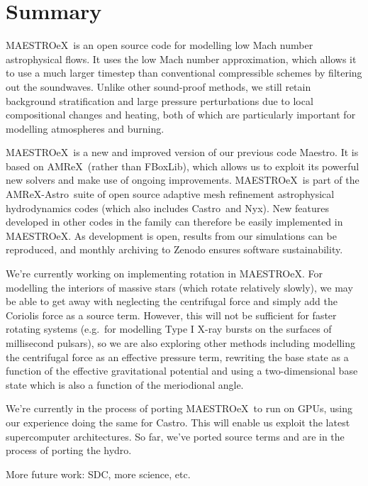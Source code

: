 \documentclass[a4paper]{jpconf}
\newcommand{\maestro}{{\sffamily Maestro}}
\newcommand{\maestroex}{{\sffamily MAESTROeX}}
\newcommand{\castro}{{\sffamily Castro}}
\newcommand{\nyx}{{\sffamily Nyx}}
\newcommand{\amrex}{{\sffamily AMReX}}
\newcommand{\amrexastro}{{\sffamily AMReX-Astro}}
\newcommand{\fboxlib}{{\sffamily FBoxLib}}
\begin{document}

\section{Summary} \label{sec:summary}

\maestroex~is an open source code for modelling low Mach number astrophysical flows. It uses the low Mach number approximation, which allows it to use a much larger timestep than conventional compressible schemes by filtering out the soundwaves. Unlike other sound-proof methods, we still retain background stratification and large pressure perturbations due to local compositional changes and heating, both of which are particularly important for modelling atmospheres and burning. 

\maestroex~is a new and improved version of our previous code \maestro. It is based on \amrex~(rather than \fboxlib), which allows us to exploit its powerful new solvers and make use of ongoing improvements. \maestroex~is part of the \amrexastro~suite of open source adaptive mesh refinement astrophysical hydrodynamics codes (which also includes \castro~and \nyx). New features developed in other codes in the family can therefore be easily implemented in \maestroex. As development is open, results from our simulations can be reproduced, and monthly archiving to Zenodo ensures software sustainability.

We're currently working on implementing rotation in \maestroex. For modelling the interiors of massive stars (which rotate relatively slowly), we may be able to get away with neglecting the centrifugal force and simply add the Coriolis force as a source term. However, this will not be sufficient for faster rotating systems (e.g.~for modelling Type I X-ray bursts on the surfaces of millisecond pulsars), so we are also exploring other methods including modelling the centrifugal force as an effective pressure term, rewriting the base state as a function of the effective gravitational potential and using a two-dimensional base state which is also a function of the meriodional angle.

We're currently in the process of porting \maestroex~to run on GPUs, using our experience doing the same for \castro. This will enable us exploit the latest supercomputer architectures. So far, we've ported source terms and are in the process of porting the hydro. 

More future work: SDC, more science, etc.
\end{document}
